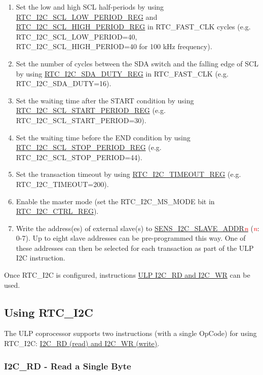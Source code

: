 \documentclass[main\_\_EN.tex]{subfiles}
\begin{document}
\begin{enumerate}
    \item Set the low and high SCL half-periods by using \hyperref[regdesc:RTCI2CSCLLOWPERIODREG]{RTC\_I2C\_SCL\_LOW\_PERIOD\_REG} and \hyperref[regdesc:RTCI2CSCLHIGHPERIODREG]{RTC\_I2C\_SCL\_HIGH\_PERIOD\_REG} in RTC\_FAST\_CLK cycles (e.g. RTC\_I2C\_SCL\_LOW\_PERIOD=40, RTC\_I2C\_SCL\_HIGH\_PERIOD=40 for 100 kHz frequency).
    \item Set the number of cycles between the SDA switch and the falling edge of SCL by using \hyperref[regdesc:RTCI2CSDADUTYREG]{RTC\_I2C\_SDA\_DUTY\_REG} in RTC\_FAST\_CLK (e.g. RTC\_I2C\_SDA\_DUTY=16).
    \item Set the waiting time after the START condition by using \hyperref[regdesc:RTCI2CSCLSTARTPERIODREG]{RTC\_I2C\_SCL\_START\_PERIOD\_REG} (e.g. RTC\_I2C\_SCL\_START\_PERIOD=30).
    \item Set the waiting time before the END condition by using \hyperref[regdesc:RTCI2CSCLSTOPPERIODREG]{RTC\_I2C\_SCL\_STOP\_PERIOD\_REG} (e.g. RTC\_I2C\_SCL\_STOP\_PERIOD=44).
    \item Set the transaction timeout by using \hyperref[regdesc:RTCI2CTIMEOUTREG]{RTC\_I2C\_TIMEOUT\_REG} (e.g. RTC\_I2C\_TIMEOUT=200).
    \item Enable the master mode (set the RTC\_I2C\_MS\_MODE bit in \hyperref[regdesc:RTCI2CCTRLREG]{RTC\_I2C\_CTRL\_REG}).
    \item Write the address(es) of external slave(s) to \hyperref[regdesc:SENSSARSLAVEADDR1REG]{SENS\_I2C\_SLAVE\_ADDR\textcolor{red}{\it{n}}} (\textcolor{red}{\it{n}}: 0-7). Up to eight slave addresses can be pre-programmed this way. One of these addresses can then be selected for each transaction as part of the ULP I2C instruction.
\end{enumerate}

Once RTC\_I2C is configured, instructions \hyperref[subsection:I2C]{ULP I2C\_RD and I2C\_WR} can be used.


\subsection{Using RTC\_I2C}

The ULP coprocessor supports two instructions (with a single OpCode) for using RTC\_I2C: \hyperref[subsection:I2C]{I2C\_RD (read) and I2C\_WR (write)}.


\subsubsection{I2C\_RD - Read a Single Byte}
\end{document}

